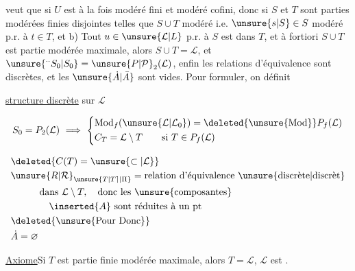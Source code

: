 
veut que si $U$  est à la fois modéré fini
et modéré cofini, donc si $S$ et $T$
sont  parties modérées finies
 disjointes telles que   $S\cup T$
modéré i.e.  $\unsure{s|S}\in S$ modéré p.r. à 
$t\in T$, et b) Tout $u\in\unsure{\mathcal L|L}$  p.r. à
$S$ est dans $T$\unsure{;|,},  et
à fortiori $S\cup T$ est partie  modérée
maximale, alors $S\cup T=\mathcal L$, et
$\unsure{{}^{\cdot\cdot}S_0|S_0}=\unsure{P|\mathcal P}_2(\mathcal L)$, enfin les relations
d'équivalence sont discrètes, et les
$\unsure{\dot A|\bar A}$ sont vides. Pour  formuler,
on définit 

  \uline{structure  discrète} sur $\mathcal L$

\[
 S_0=P_2(\mathcal L)\ \Longrightarrow\
 \left\{\begin{aligned}
 &\mathrm{Mod}_f(\unsure{\mathcal L|\mathcal L_0})=\deleted{\unsure{\mathrm{Mod}}}P_f(\mathcal L)\\
 &C_T=\mathcal L\setminus T\qquad\text{si }T\in P_f(\mathcal L)
 \end{aligned}\right.
\]

\[
\begin{aligned}
 &\deleted{C(T)=\unsure{\subset|\mathcal L}}\\
 &\unsure{R|\mathcal R}_{\unsure{T|T\rceil|\Pi}}=\text{relation d'équivalence \unsure{discrète|discrèt}}\\
 &\hspace{3em}\text{dans }\mathcal L\setminus T,\quad\text{donc les \unsure{composantes}}\\
 &\hspace{4em} \inserted{A}\ \text{sont réduites à un pt}\\
 &\deleted{\text{\unsure{Pour Donc}}}\\
 &\dot A=\varnothing
\end{aligned}
\]

\uline{Axiome}\quad Si $T$ est partie finie modérée
maximale, alors $T=\mathcal L$, $\mathcal L$ est .

